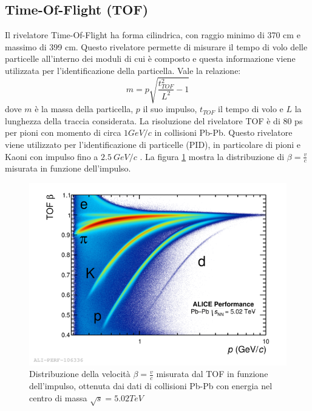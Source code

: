     \subsection{Time-Of-Flight (TOF)} \label{TOF}
    Il rivelatore Time-Of-Flight ha forma cilindrica, con raggio minimo di 370 cm e massimo di 399 cm. Questo rivelatore permette di misurare il tempo di volo delle particelle all'interno dei moduli di cui è composto e questa informazione viene utilizzata per l'identificazione della particella. Vale la relazione:
        \begin{equation}
            m = p\sqrt{\frac{t^2_{TOF}}{L^2}-1}
        \end{equation}
    dove $m$ è la massa della particella, $p$ il suo impulso, $t_{TOF}$ il tempo di volo e $L$ la lunghezza della traccia considerata. La risoluzione del rivelatore TOF è di 80 ps per pioni con momento di circa $1 GeV/c$ in collisioni Pb-Pb.
    Questo rivelatore viene utilizzato per l'identificazione di particelle (PID), in particolare di pioni e Kaoni con impulso fino a $2.5 \ GeV/c$ . La figura \ref{fig:TOF} mostra la distribuzione di $\beta = \frac{v}{c}$ misurata in funzione dell'impulso. 
    \begin{figure}[htbp]
        \centering
        \includegraphics[width=0.8\linewidth]{ALICE/beta.png}
        \caption{Distribuzione della velocità $\beta = \frac{v}{c}$ misurata dal TOF in funzione dell'impulso, ottenuta dai dati di collisioni Pb-Pb con energia nel centro di massa $\sqrt{s} = 5.02 TeV$}
        \label{fig:TOF}
    \end{figure}
    
    